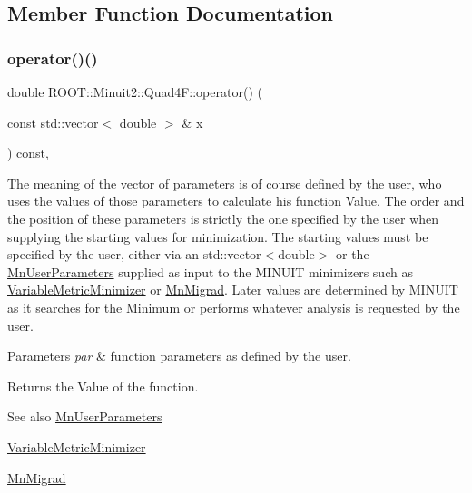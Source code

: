 \subsection{Member Function Documentation}
\mbox{\label{classROOT_1_1Minuit2_1_1Quad4F_a41964a71fa65445e18c041fbdc724a03}} 
\subsubsection{\texorpdfstring{operator()()}{operator()()}}
{\footnotesize\ttfamily double R\+O\+O\+T\+::\+Minuit2\+::\+Quad4\+F\+::operator() (\begin{DoxyParamCaption}\item[{const std\+::vector$<$ double $>$ \&}]{x }\end{DoxyParamCaption}) const\hspace{0.3cm}{\ttfamily [inline]}, {\ttfamily [virtual]}}

The meaning of the vector of parameters is of course defined by the user, who uses the values of those parameters to calculate his function Value. The order and the position of these parameters is strictly the one specified by the user when supplying the starting values for minimization. The starting values must be specified by the user, either via an std\+::vector$<$double$>$ or the \mbox{\hyperlink{classROOT_1_1Minuit2_1_1MnUserParameters}{Mn\+User\+Parameters}} supplied as input to the M\+I\+N\+U\+IT minimizers such as \mbox{\hyperlink{classROOT_1_1Minuit2_1_1VariableMetricMinimizer}{Variable\+Metric\+Minimizer}} or \mbox{\hyperlink{classROOT_1_1Minuit2_1_1MnMigrad}{Mn\+Migrad}}. Later values are determined by M\+I\+N\+U\+IT as it searches for the Minimum or performs whatever analysis is requested by the user.


\begin{DoxyParams}{Parameters}
{\em par} & function parameters as defined by the user.\\
\hline
\end{DoxyParams}
\begin{DoxyReturn}{Returns}
the Value of the function.
\end{DoxyReturn}
\begin{DoxySeeAlso}{See also}
\mbox{\hyperlink{classROOT_1_1Minuit2_1_1MnUserParameters}{Mn\+User\+Parameters}} 

\mbox{\hyperlink{classROOT_1_1Minuit2_1_1VariableMetricMinimizer}{Variable\+Metric\+Minimizer}} 

\mbox{\hyperlink{classROOT_1_1Minuit2_1_1MnMigrad}{Mn\+Migrad}} 
\end{DoxySeeAlso}


